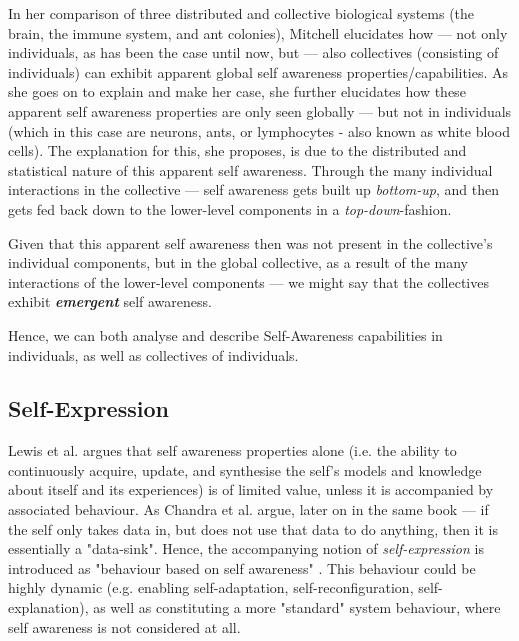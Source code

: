	In her comparison of three distributed and collective biological systems (the brain, the immune system, and ant colonies), Mitchell \cite{mitchell_decentralizedSA} elucidates how — not only individuals, as has been the case until now, but — also collectives (consisting of individuals) can exhibit apparent global self awareness properties/capabilities. As she goes on to explain and make her case, she further elucidates how these apparent self awareness properties are only seen globally — but not in individuals (which in this case are neurons, ants, or lymphocytes - also known as white blood cells). The explanation for this, she proposes, is due to the distributed and statistical nature of this apparent self awareness. Through the many individual interactions in the collective — self awareness gets built up \textit{bottom-up}, and then gets fed back down to the lower-level components in a \textit{top-down}-fashion.

	Given that this apparent self awareness then was not present in the collective's individual components, but in the global collective, as a result of the many interactions of the lower-level components — we might say that the collectives exhibit \textbf{\textit{emergent}} self awareness.

	Hence, we can both analyse and describe Self-Awareness capabilities in individuals, as well as collectives of individuals.


	\subsection{Self-Expression}
	\label{subsec:SE}
	
	Lewis et al. \cite{sacs16_ch2} argues that self awareness properties alone (i.e. the ability to continuously acquire, update, and synthesise the self's models and knowledge about itself and its experiences) is of limited value, unless it is accompanied by associated behaviour. As Chandra et al. \cite{sacs16_ch4} argue, later on in the same book — if the self only takes data in, but does not use that data to do anything, then it is essentially a "data-sink". Hence, the accompanying notion of \textit{self-expression} is introduced as "behaviour based on self awareness" \cite{sacs16_ch2}. This behaviour could be highly dynamic (e.g. enabling self-adaptation, self-reconfiguration, self-explanation), as well as constituting a more "standard" system behaviour, where self awareness is not considered at all.




